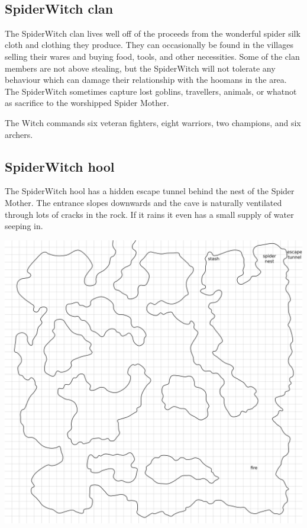 \


\subsection*{SpiderWitch clan}

The SpiderWitch clan lives well off of the proceeds from the wonderful spider silk cloth and clothing they produce. They can occasionally be found in the villages selling their wares and buying food, tools, and other necessities. Some of the clan members are not above stealing, but the SpiderWitch will not tolerate any behaviour which can damage their relationship with the hoomans in the area. The SpiderWitch sometimes capture lost goblins, travellers, animals, or whatnot as sacrifice to the worshipped Spider Mother.

The Witch commands six veteran fighters, eight warriors, two champions, and six archers.


\subsection*{SpiderWitch hool}

The SpiderWitch hool has a hidden escape tunnel behind the nest of the Spider Mother. The entrance slopes downwards and the cave is naturally ventilated through lots of cracks in the rock. If it rains it even has a small supply of water seeping in. 

\noindent
\includegraphics[width=0.999\textwidth]{./map/hool2.png}


